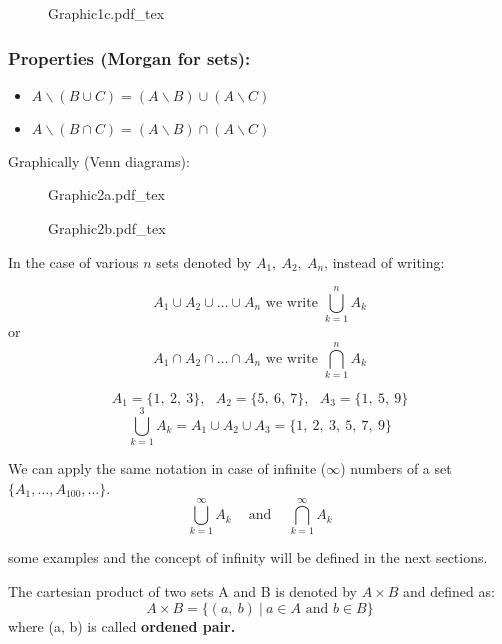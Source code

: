 \documentclass[12pt, a4paper]{book}
\newcommand{\incfig}[1]{%
\def\svgscale{1}
{#1.pdf_tex}
}
\begin{document}
\begin{figure}[H]
  \centering
  \incfig{Graphic1c}
\end{figure}

\subsubsection*{Properties (Morgan for sets): }

\begin{itemize}
  \item $A \backslash (B \cup C) = (A \backslash B) \cup (A \backslash C)$
  \item $A \backslash (B \cap C) = (A \backslash B) \cap (A \backslash C)$
\end{itemize}

Graphically (Venn diagrams):

\begin{figure}[H]
  \centering
  \incfig{Graphic2a}
\end{figure}

\begin{figure}[H]
  \centering
  \incfig{Graphic2b}
\end{figure}

\begin{note}
  In the case of various $n$ sets denoted by $A_1, \ A_2, \ A_n$, instead of writing:

  \[
    A_1 \cup A_2 \cup \ldots \cup A_n \text{ we write } \bigcup_{k=1}^{n} A_k
  \]
  or
  \[
    A_1 \cap A_2 \cap \ldots \cap A_n \text{ we write } \bigcap_{k=1}^{n} A_k
  \]
\end{note}

\begin{exmp}
  \[
    A_1=\{1, \ 2, \ 3 \}, \ \ \ A_2=\{ 5,\ 6, \ 7 \}, \ \ \ A_3= \{1, \ 5, \ 9 \}
  \]
  \[
    \bigcup_{k=1}^{3} A_k=A_1 \cup A_2 \cup A_3 = \{ 1, \ 2, \ 3, \ 5, \ 7, \ 9 \}
  \]
\end{exmp}

\begin{rem}
We can apply the same notation in case of infinite ($\infty$) numbers of a set $\{ A_1, \ldots, A_{100}, \ldots \}$.
\[
  \displaystyle\bigcup_{k=1}^{\infty}A_k \ \ \ \ \text{ and } \ \ \ \ \displaystyle\bigcap_{k=1}^{\infty}A_k
\]
\end{rem}
some examples and the concept of infinity will be defined in the next sections.

\begin{defn}
  The cartesian product of two sets A and B is denoted by \boldmath $A \times B$  and defined as:
  \[
    A \times B = \{ (a, \ b  ) \ | \ a \in A \text{ and } b \in B \}
  \]
  \unboldmath
  where (a, b) is called \textbf{ordened pair.} 
\end{defn}
\end{document}
